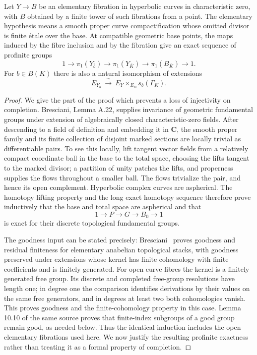 \documentclass[11pt,a4paper]{article}
\begin{document}
Let $Y\to B$ be an elementary fibration in hyperbolic curves in characteristic zero, with $B$ obtained by a finite tower of such fibrations from a point. The elementary hypothesis means a smooth proper curve compactification whose omitted divisor is finite étale over the base. At compatible geometric base points, the maps induced by the fibre inclusion and by the fibration give an exact sequence of profinite groups
\[
 1\longrightarrow\pi_1(Y_{\bar b})\longrightarrow\pi_1(Y_{\overline K})
 \longrightarrow\pi_1(B_{\overline K})\longrightarrow1.
\]
For $b\in B(K)$ there is also a natural isomorphism of extensions
\[
 E_{Y_b}\ \xrightarrow{\ \sim\ }\ E_Y\times_{E_B}s_b(\Gamma_K).
\]
\begin{proof}
We give the part of the proof which prevents a loss of injectivity on completion. Bresciani, Lemma A.22, supplies invariance of geometric fundamental groups under extension of algebraically closed characteristic-zero fields. After descending to a field of definition and embedding it in $\mathbf C$, the smooth proper family and its finite collection of disjoint marked sections are locally trivial as differentiable pairs. To see this locally, lift tangent vector fields from a relatively compact coordinate ball in the base to the total space, choosing the lifts tangent to the marked divisor; a partition of unity patches the lifts, and properness supplies the flows throughout a smaller ball. The flows trivialize the pair, and hence its open complement. Hyperbolic complex curves are aspherical. The homotopy lifting property and the long exact homotopy sequence therefore prove inductively that the base and total space are aspherical and that
\[
 1\to P\to G\to B_0\to1
\]
is exact for their discrete topological fundamental groups.

The goodness input can be stated precisely: Bresciani~\cite[Lemmas 10.9 and 10.11]{Bresciani2021} proves goodness and residual finiteness for elementary anabelian topological stacks, with goodness preserved under extensions whose kernel has finite cohomology with finite coefficients and is finitely generated. For open curve fibres the kernel is a finitely generated free group. Its discrete and completed free-group resolutions have length one; in degree one the comparison identifies derivations by their values on the same free generators, and in degrees at least two both cohomologies vanish. This proves goodness and the finite-cohomology property in this case. Lemma 10.10 of the same source proves that finite-index subgroups of a good group remain good, as needed below. Thus the identical induction includes the open elementary fibrations used here. We now justify the resulting profinite exactness rather than treating it as a formal property of completion.


\end{proof}
\end{document}
